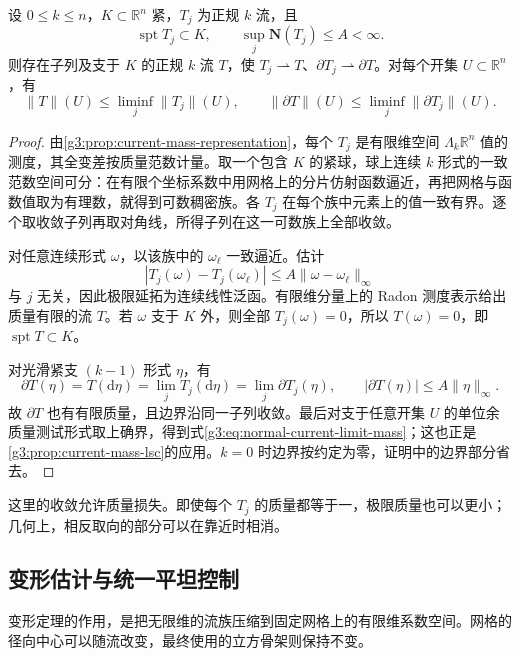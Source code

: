 \begin{theorem}\label{g3:thm:normal-current-weak-compactness}
	设 \(0\le k\le n\)，\(K\subset\mathbb R^n\) 紧，\(T_j\) 为正规 \(k\) 流，且
	\[
		\operatorname{spt}T_j\subset K,\qquad
		\sup_j\mathbf N(T_j)\le A<\infty.
	\]
	则存在子列及支于 \(K\) 的正规 \(k\) 流 \(T\)，使 \(T_j\rightharpoonup T\)、\(\partial T_j\rightharpoonup\partial T\)。对每个开集 \(U\subset\mathbb R^n\)，有
	\begin{equation}\label{g3:eq:normal-current-limit-mass}
		\|T\|(U)\le\liminf_j\|T_j\|(U),\qquad
		\|\partial T\|(U)\le\liminf_j\|\partial T_j\|(U).
	\end{equation}
\end{theorem}
\begin{proof}
	由\cref{g3:prop:current-mass-representation}，每个 \(T_j\) 是有限维空间 \(\Lambda_k\mathbb R^n\) 值的测度，其全变差按质量范数计量。取一个包含 \(K\) 的紧球，球上连续 \(k\) 形式的一致范数空间可分：在有限个坐标系数中用网格上的分片仿射函数逼近，再把网格与函数值取为有理数，就得到可数稠密族。各 \(T_j\) 在每个族中元素上的值一致有界。逐个取收敛子列再取对角线，所得子列在这一可数族上全部收敛。

	对任意连续形式 \(\omega\)，以该族中的 \(\omega_\ell\) 一致逼近。估计
	\[
		|T_j(\omega)-T_j(\omega_\ell)|
		\le A\|\omega-\omega_\ell\|_\infty
	\]
	与 \(j\) 无关，因此极限延拓为连续线性泛函。有限维分量上的 Radon 测度表示给出质量有限的流 \(T\)。若 \(\omega\) 支于 \(K\) 外，则全部 \(T_j(\omega)=0\)，所以 \(T(\omega)=0\)，即 \(\operatorname{spt}T\subset K\)。

	对光滑紧支 \((k-1)\) 形式 \(\eta\)，有
	\[
		\partial T(\eta)=T(\mathrm d\eta)
		=\lim_jT_j(\mathrm d\eta)=\lim_j\partial T_j(\eta),
		\qquad |\partial T(\eta)|\le A\|\eta\|_\infty.
	\]
	故 \(\partial T\) 也有有限质量，且边界沿同一子列收敛。最后对支于任意开集 \(U\) 的单位余质量测试形式取上确界，得到式\eqref{g3:eq:normal-current-limit-mass}；这也正是\cref{g3:prop:current-mass-lsc}的应用。\(k=0\) 时边界按约定为零，证明中的边界部分省去。
\end{proof}

这里的收敛允许质量损失。即使每个 \(T_j\) 的质量都等于一，极限质量也可以更小；几何上，相反取向的部分可以在靠近时相消。

\subsection{变形估计与统一平坦控制}
\label{g3:subsec:2205:02}
变形定理的作用，是把无限维的流族压缩到固定网格上的有限维系数空间。网格的径向中心可以随流改变，最终使用的立方骨架则保持不变。

